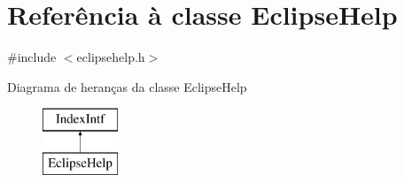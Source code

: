 \hypertarget{class_eclipse_help}{\section{Referência à classe Eclipse\-Help}
\label{class_eclipse_help}
}


{\ttfamily \#include $<$eclipsehelp.\-h$>$}

Diagrama de heranças da classe Eclipse\-Help\begin{figure}[H]
\begin{center}
\leavevmode
\includegraphics[height=2.000000cm]{class_eclipse_help}
\end{center}
\end{figure}
